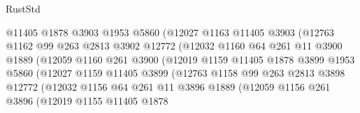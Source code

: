 \begin{lexlean}{RustStd}
\begin{coremodule}
{\begin{coremodule}
{{{{{{{{{{{{{{{{{{{{{{{{{{{{{                            @11405
                            @1878
                            @3903
                            @1953
                            @5860
                            (@12027
                              @1163
                              @11405
                              @3903
                              (@12763
                                @1162
                                @99
                                @263
                                @2813
                                @3902
                                @12772
                                (@12032
                                  @1160
                                  @64
                                  @261
                                  @11
                                  @3900
                                  @1889
                                  (@12059
                                    @1160
                                    @261
                                    @3900
                                    (@12019
                                      @1159
                                      @11405
                                      @1878
                                      @3899
                                      @1953
                                      @5860
                                      (@12027
                                        @1159
                                        @11405
                                        @3899
                                        (@12763
                                          @1158
                                          @99
                                          @263
                                          @2813
                                          @3898
                                          @12772
                                          (@12032
                                            @1156
                                            @64
                                            @261
                                            @11
                                            @3896
                                            @1889
                                            (@12059
                                              @1156
                                              @261
                                              @3896
                                              (@12019
                                                @1155
                                                @11405
                                                @1878
}}}}}}}}}}}}}}}}}}}}}}}}}}}}}
\end{coremodule}}
\end{coremodule}
\end{lexlean}
